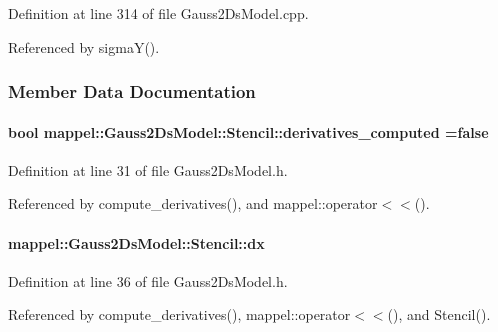 Definition at line 314 of file Gauss2\+Ds\+Model.\+cpp.



Referenced by sigma\+Y().



\subsubsection{Member Data Documentation}
\paragraph[{\texorpdfstring{derivatives\+\_\+computed}{derivatives_computed}}]{\setlength{\rightskip}{0pt plus 5cm}bool mappel\+::\+Gauss2\+Ds\+Model\+::\+Stencil\+::derivatives\+\_\+computed =false}\hypertarget{classmappel_1_1Gauss2DsModel_1_1Stencil_a5b850a03436f6e189848d06e8bc1bc67}{}\label{classmappel_1_1Gauss2DsModel_1_1Stencil_a5b850a03436f6e189848d06e8bc1bc67}


Definition at line 31 of file Gauss2\+Ds\+Model.\+h.



Referenced by compute\+\_\+derivatives(), and mappel\+::operator$<$$<$().

\paragraph[{\texorpdfstring{dx}{dx}}]{ mappel\+::\+Gauss2\+Ds\+Model\+::\+Stencil\+::dx}\hypertarget{classmappel_1_1Gauss2DsModel_1_1Stencil_a044c0a62c198349e8d51c6fa36556f31}{}\label{classmappel_1_1Gauss2DsModel_1_1Stencil_a044c0a62c198349e8d51c6fa36556f31}


Definition at line 36 of file Gauss2\+Ds\+Model.\+h.



Referenced by compute\+\_\+derivatives(), mappel\+::operator$<$$<$(), and Stencil().


